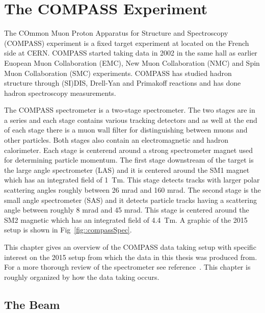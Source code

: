 \chapter{The COMPASS Experiment} 
\label{Chap::compass}
\ifpdf
\graphicspath{{Chapters/COMPASS/Figs/Raster/}{Chapters/COMPASS/Figs/PDF/}{Chapters/COMPASS/Figs/}}
\else \graphicspath{{Chapters/COMPASS/Figs/Vector/}{Chapters/COMPASS/Figs/}} \fi

The COmmon Muon Proton Apparatus for Structure and Spectroscopy (COMPASS)
experiment is a fixed target experiment at located on the French side at CERN.
COMPASS started taking data in 2002 in the same hall as earlier Euopean Muon
Collaboration (EMC), New Muon Collaboration (NMC) and Spin Muon Collaboration
(SMC) experiments.  COMPASS has studied hadron structure through (SI)DIS,
Drell-Yan and Primakoff reactions and has done hadron spectroscopy measurements.
\par

The COMPASS spectrometer is a two-stage spectrometer.  The two stages are in a
series and each stage contains various tracking detectors and as well at the end
of each stage there is a muon wall filter for distinguishing between muons and
other particles.  Both stages also contain an electromagnetic and hadron
calorimeter.  Each stage is centerend around a strong spectrometer magnet used
for determining particle momentum.  The first stage downstream of the target is
the large angle spectrometer (LAS) and it is centered around the SM1 magnet
which has an integrated field of 1~Tm.  This stage detects tracks with larger
polar scattering angles roughly between 26 mrad and 160 mrad.  The second stage
is the small angle spectrometer (SAS) and it detects particle tracks having a
scattering angle between roughly 8 mrad and 45 mrad.  This stage is centered
around the SM2 magnetic which has an integrated field of 4.4~Tm.  A graphic of
the 2015 setup is shown in Fig~\ref{fig::compassSpec}.\par

This chapter gives an overview of the COMPASS data taking setup with specific
interest on the 2015 setup from which the data in this thesis was produced from.
For a more thorough review of the spectrometer see
reference~\cite{compassSpec}.  This chapter is roughly organized by how the
data taking occurs.

\section{The Beam}

